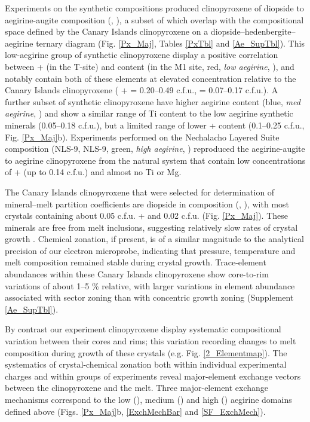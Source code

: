 \documentclass[review,authoryear,12pt]{elsarticle}
\begin{document}
Experiments on the synthetic compositions produced clinopyroxene of diopside to aegirine-augite composition
(,  ), a subset of which overlap with the compositional space defined by the Canary Islands clinopyroxene on a diopside--hedenbergite--aegirine ternary diagram (Fig. \ref{Px_Maj}, Tables \ref{PxTbl} and \ref{Ae_SupTbl}). This low-aegirine group of synthetic clinopyroxene display a positive correlation between  +  (in the T-site) and  content (in the M1 site, red, \emph{low aegirine}, ), and notably contain both of these elements at elevated concentration relative to the Canary Islands clinopyroxene ( +  = 0.20--0.49 c.f.u.,  = 0.07--0.17 c.f.u.). A further subset of synthetic clinopyroxene have higher aegirine content (blue, \emph{med aegirine}, ) and show a similar range of Ti content to the low aegirine synthetic minerals (0.05--0.18 c.f.u.), but a limited range of lower  +  content (0.1--0.25 c.f.u., Fig. \ref{Px_Maj}b). Experiments performed on the Nechalacho Layered Suite composition (NLS-9, NLS-9, green, \emph{high aegirine}, ) reproduced the aegirine-augite to aegirine clinopyroxene from the natural system \citep{Moller2016} that contain low concentrations of  +  (up to 0.14 c.f.u.) and almost no Ti or Mg.

The Canary Islands clinopyroxene that were selected for determination of mineral--melt partition coefficients are diopside in composition (,  ), with most crystals containing about 0.05 c.f.u.  +  and 0.02 c.f.u.  (Fig. \ref{Px_Maj}). These minerals are free from melt inclusions, suggesting relatively slow rates of crystal growth \citep[][Fig. \ref{3_ChemTransect}]{Kennedy1993}. Chemical zonation, if present, is of a similar magnitude to the analytical precision of our electron microprobe, indicating that pressure, temperature and melt composition remained stable during crystal growth. Trace-element abundances within these Canary Islands clinopyroxene show core-to-rim variations of about 1--5 \% relative, with larger variations in element abundance associated with sector zoning than with concentric growth zoning (Supplement \ref{Ae_SupTbl}).

By contrast our experiment clinopyroxene display systematic compositional variation between their cores and rims; this variation recording changes to melt composition during growth of these crystals (e.g. Fig. \ref{2_Elementmap}). 
The systematics of crystal-chemical zonation both within individual experimental charges and within groups of experiments reveal major-element exchange vectors between the clinopyroxene and the melt.
Three major-element exchange mechanisms correspond to the low (), medium () and high () aegirine domains defined above (Figs. \ref{Px_Maj}b, \ref{ExchMechBar} and \ref{SF_ExchMech}). 
\end{document}
